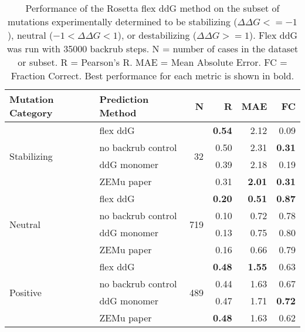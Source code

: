 \begin{table}
  \begin{tabular}{llrrrr}
\toprule
Mutation Category &   Prediction Method &    N &    R &  MAE &   FC \\
\midrule
 \multirow{ 4}{*}{Stabilizing} & flex ddG & \multirow{ 4}{*}{32} & \textbf{0.54} & 2.12 & 0.09  \\
 & no backrub control & & 0.50 & 2.31 & \textbf{0.31}  \\
 & ddG monomer & & 0.39 & 2.18 & 0.19  \\
 & ZEMu paper & & 0.31 & \textbf{2.01} & \textbf{0.31}  \\
\hline
 \multirow{ 4}{*}{Neutral} & flex ddG & \multirow{ 4}{*}{719} & \textbf{0.20} & \textbf{0.51} & \textbf{0.87}  \\
 & no backrub control & & 0.10 & 0.72 & 0.78  \\
 & ddG monomer & & 0.13 & 0.75 & 0.80  \\
 & ZEMu paper & & 0.16 & 0.66 & 0.79  \\
\hline
 \multirow{ 4}{*}{Positive} & flex ddG & \multirow{ 4}{*}{489} & \textbf{0.48} & \textbf{1.55} & 0.63  \\
 & no backrub control & & 0.44 & 1.63 & 0.67  \\
 & ddG monomer & & 0.47 & 1.71 & \textbf{0.72}  \\
 & ZEMu paper & & \textbf{0.48} & 1.63 & 0.62  \\
\bottomrule
\end{tabular}
  \caption[Flex ddG performance on stabilizing mutations]{
    Performance of the Rosetta flex ddG method on the subset of mutations experimentally determined to be stabilizing ($\Delta\Delta G <= -1$), neutral ($-1 < \Delta\Delta G < 1$), or destabilizing ($\Delta\Delta G >= 1$). Flex ddG was run with 35000 backrub steps. N = number of cases in the dataset or subset. R = Pearson's R. MAE = Mean Absolute Error. FC = Fraction Correct. Best performance for each metric is shown in bold.
  } \label{tab:table-stabilizing}
\end{table}
